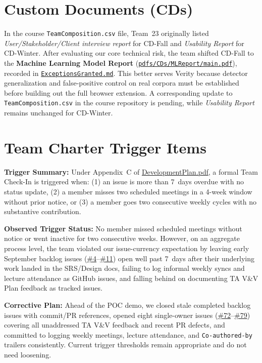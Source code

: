 \documentclass{article}
\begin{document}
\section{Custom Documents (CDs)}

In the course \texttt{TeamComposition.csv} file, Team~23 originally listed \emph{User/Stakeholder/Client interview report} for CD-Fall and \emph{Usability Report} for CD-Winter. After evaluating our core technical risk, the team shifted CD-Fall to the \textbf{Machine Learning Model Report} (\href{https://github.com/richy1337/Verity/blob/main/pdfs/CDs/MLReport/main.pdf}{\texttt{pdfs/CDs/MLReport/main.pdf}}), recorded in \href{https://github.com/richy1337/Verity/blob/main/ExceptionsGranted.md}{\texttt{ExceptionsGranted.md}}. This better serves Verity because detector generalization and false-positive control on real corpora must be established before building out the full browser extension. A corresponding update to \texttt{TeamComposition.csv} in the course repository is pending, while \emph{Usability Report} remains unchanged for CD-Winter.

\section{Team Charter Trigger Items}

\noindent \textbf{Trigger Summary:} Under Appendix~C of \href{https://github.com/richy1337/Verity/blob/main/pdfs/DevelopmentPlan/DevelopmentPlan.pdf}{DevelopmentPlan.pdf}, a formal Team Check-In is triggered when: (1) an issue is more than 7~days overdue with no status update, (2) a member misses two scheduled meetings in a 4-week window without prior notice, or (3) a member goes two consecutive weekly cycles with no substantive contribution.

\medskip\noindent \textbf{Observed Trigger Status:} No member missed scheduled meetings without notice or went inactive for two consecutive weeks. However, on an aggregate process level, the team violated our issue-currency expectation by leaving early September backlog issues (\href{https://github.com/richy1337/Verity/issues/4}{\#4}--\href{https://github.com/richy1337/Verity/issues/11}{\#11}) open well past 7~days after their underlying work landed in the SRS/Design docs, failing to log informal weekly syncs and lecture attendance as GitHub issues, and falling behind on documenting TA V\&V Plan feedback as tracked issues.

\medskip\noindent \textbf{Corrective Plan:} Ahead of the POC demo, we closed stale completed backlog issues with commit/PR references, opened eight single-owner issues (\href{https://github.com/richy1337/Verity/issues/72}{\#72}--\href{https://github.com/richy1337/Verity/issues/79}{\#79}) covering all unaddressed TA V\&V feedback and recent PR defects, and committed to logging weekly meetings, lecture attendance, and \texttt{Co-authored-by} trailers consistently. Current trigger thresholds remain appropriate and do not need loosening.
\end{document}
